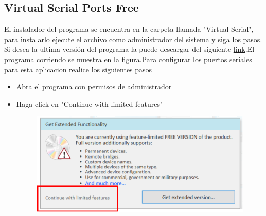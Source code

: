 \documentclass[letterpaper,12pt]{article}
\begin{document}
\subsection{Virtual Serial Ports Free}
\label{sec:virtualPort}
El instalador del programa se encuentra en la carpeta llamada "Virtual Serial", para instalarlo ejecute el archivo como administrador del sistema y siga los pasos. Si desea la ultima versión del programa la puede descargar del siguiente \href{https://freevirtualserialports.com/}{link}.El programa corriendo se muestra en la figura.Para configurar los puertos seriales para esta aplicacion realice los siguientes pasos
\begin{itemize}
	\item Abra el programa con permisos de administrador
	\item Haga click en "Continue with limited features"
\begin{figure}[H]
	\centering
	\includegraphics[width=0.7\linewidth]{images/virtual1}

	\label{fig:virtual1}
\end{figure}


\end{itemize}
\end{document}
